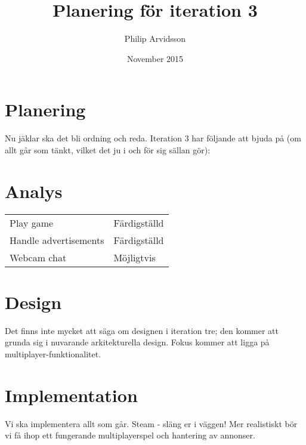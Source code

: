 \documentclass[a4paper]{article}
\title{Planering för iteration 3}
\author{Philip Arvidsson}
\date{November 2015}
\begin{document}
    \maketitle

    \section{Planering}
    Nu jäklar ska det bli ordning och reda. Iteration 3 har följande att bjuda
    på (om allt går som tänkt, vilket det ju i och för sig sällan gör):

    \section{Analys}

    \begin{tabular}{ll}
        Play game & Färdigställd \\
        Handle advertisements & Färdigställd \\
        Webcam chat & Möjligtvis \\
    \end{tabular}

    \section{Design}
    Det finns inte mycket att säga om designen i iteration tre; den kommer att
    grunda sig i nuvarande arkitekturella design. Fokus kommer att ligga på
    multiplayer-funktionalitet.

    \section{Implementation}
    Vi ska implementera allt som går. Steam - släng er i väggen! Mer realistiskt
    bör vi få ihop ett fungerande multiplayerspel och hantering av annonser.
\end{document}
